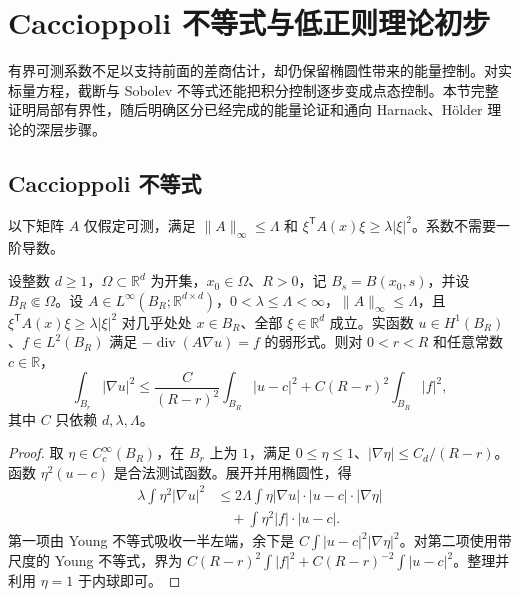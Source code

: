 \section{Caccioppoli 不等式与低正则理论初步}
\label{b2:sec:1604}

有界可测系数不足以支持前面的差商估计，却仍保留椭圆性带来的能量控制。对实标量方程，截断与 Sobolev 不等式还能把积分控制逐步变成点态控制。本节完整证明局部有界性，随后明确区分已经完成的能量论证和通向 Harnack、Hölder 理论的深层步骤。

\subsection{Caccioppoli 不等式}
\label{b2:subsec:160401}

以下矩阵 \(A\) 仅假定可测，满足 \(\lVert A\rVert_\infty\le\Lambda\) 和 \(\xi^{\mathsf T}A(x)\xi\ge\lambda|\xi|^2\)。系数不需要一阶导数。

\begin{proposition}[内部能量估计]
\label{b2:prop:16-caccioppoli}
设整数 \(d\geq1\)，\(\Omega\subset\mathbb R^d\) 为开集，\(x_0\in\Omega\)、\(R>0\)，记 \(B_s=B(x_0,s)\)，并设 \(B_R\Subset\Omega\)。设 \(A\in L^\infty(B_R;\mathbb R^{d\times d})\)，\(0<\lambda\leq\Lambda<\infty\)，\(\|A\|_\infty\leq\Lambda\)，且 \(\xi^{\mathsf T}A(x)\xi\geq\lambda|\xi|^2\) 对几乎处处 \(x\in B_R\)、全部 \(\xi\in\mathbb R^d\) 成立。实函数 \(u\in H^1(B_R)\)、\(f\in L^2(B_R)\) 满足 \(-\operatorname{div}(A\nabla u)=f\) 的弱形式。则对 \(0<r<R\) 和任意常数 \(c\in\mathbb R\)，
\[
 \int_{B_r}|\nabla u|^2\le
 \frac{C}{(R-r)^2}\int_{B_R}|u-c|^2
       +C(R-r)^2\int_{B_R}|f|^2,
\]
其中 \(C\) 只依赖 \(d,\lambda,\Lambda\)。
\end{proposition}
\begin{proof}
取 \(\eta\in C_c^\infty(B_R)\)，在 \(B_r\) 上为 \(1\)，满足 \(0\le\eta\le1\)、\(|\nabla\eta|\le C_d/(R-r)\)。函数 \(\eta^2(u-c)\) 是合法测试函数。展开并用椭圆性，得
\[
 \begin{aligned}
 \lambda\int\eta^2|\nabla u|^2
 &\le2\Lambda\int\eta|\nabla u|\cdot|u-c|\cdot|\nabla\eta|\\
 &\quad+\int\eta^2|f|\cdot|u-c|.
 \end{aligned}
\]
第一项由 Young 不等式吸收一半左端，余下是 \(C\int|u-c|^2|\nabla\eta|^2\)。对第二项使用带尺度的 Young 不等式，界为 \(C(R-r)^2\int|f|^2+C(R-r)^{-2}\int|u-c|^2\)。整理并利用 \(\eta=1\) 于内球即可。
\end{proof}

